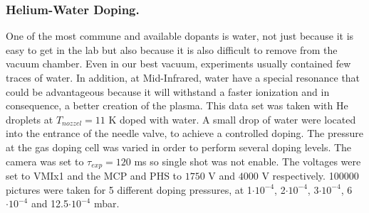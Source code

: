\subsubsection{Helium-Water Doping.}

One of the most commune and available dopants is water, not just because it is easy to get in the lab but also because it is also difficult to remove from the vacuum chamber. Even in our best vacuum, experiments usually contained few traces of water. In addition, at Mid-Infrared, water have a special resonance that could be advantageous because it will withstand a faster ionization and in consequence, a better creation of the plasma. This data set was taken with He droplets at $T_{nozzel}=11$ K doped with water. A small drop of water were located into the entrance of the needle valve, to achieve a controlled doping. The pressure at the gas doping cell was varied in order to perform several doping levels. The camera was set to $\tau_{exp}=120$ ms so single shot was not enable. The voltages were set to VMIx1 and the MCP and PHS to $1750$ V and $4000$ V respectively. 100000 pictures were taken for 5 different doping pressures, at 1$\cdot10^{-4}$, 2$\cdot10^{-4}$, 3$\cdot10^{-4}$, 6$\cdot10^{-4}$ and 12.5$\cdot10^{-4}$ mbar. 

